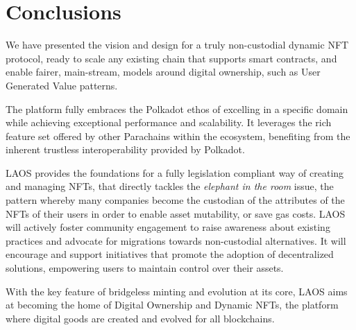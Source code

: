 \section{Conclusions} \label{conclusion}

We have presented the vision and design for a truly non-custodial
dynamic NFT protocol, ready to scale any existing chain that 
supports smart contracts,
and enable fairer, main-stream,
models around digital ownership, 
such as User Generated Value patterns.

The platform fully embraces the Polkadot ethos of
excelling in a specific domain while achieving
exceptional performance and scalability.
It leverages the rich feature set
offered by other Parachains within the ecosystem,
benefiting from the inherent trustless interoperability
provided by Polkadot.

LAOS provides the foundations for a fully legislation compliant 
way of creating and managing NFTs, that directly tackles the {\it elephant
in the room} issue, the pattern whereby many companies become the custodian
of the attributes of the NFTs of their users in order to enable asset mutability, or save 
gas costs. LAOS will actively foster community engagement
to raise awareness about existing practices and advocate
for migrations towards non-custodial alternatives.
It will encourage and support initiatives that promote
the adoption of decentralized solutions,
empowering users to maintain control over their assets.

With the key feature of bridgeless minting and evolution at its core,
LAOS aims at becoming the home of Digital Ownership and Dynamic NFTs, the platform
where digital goods are created and evolved for all blockchains.






